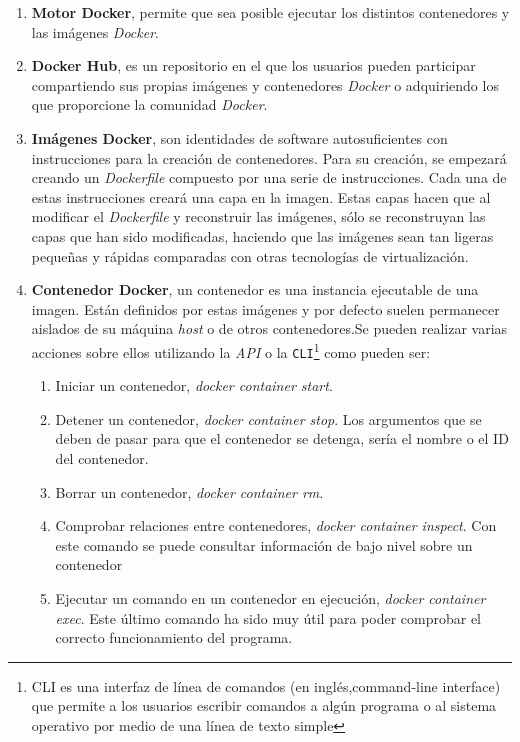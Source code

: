 \begin{enumerate}
\begin{enumerate}
    \end{enumerate}
    \item \textbf{Motor Docker}, permite que sea posible ejecutar los distintos contenedores y las imágenes \textit{Docker}. 
    \item \textbf{Docker Hub}, es un repositorio en el que los usuarios pueden participar compartiendo sus propias imágenes y contenedores \textit{Docker} o adquiriendo los que proporcione la comunidad \textit{Docker}. 
    \item \textbf{Imágenes Docker}, son identidades de software autosuficientes con instrucciones para la creación de contenedores. Para su creación, se empezará creando un \textit{Dockerfile} compuesto por una serie de instrucciones. Cada una de estas instrucciones creará una capa en la imagen. Estas capas hacen que al modificar el \textit{Dockerfile} y reconstruir las imágenes, sólo se reconstruyan las capas que han sido modificadas, haciendo que las imágenes sean tan ligeras pequeñas y rápidas comparadas con otras tecnologías de virtualización.
    \item \textbf{Contenedor Docker}, un contenedor es una instancia ejecutable de una imagen. Están definidos por estas imágenes y por defecto suelen permanecer aislados de su máquina \textit{host} o de otros contenedores.Se pueden realizar varias acciones sobre ellos utilizando la \textit{API} o la \texttt{CLI}\footnote{CLI es una interfaz de línea de comandos (en inglés,command-line interface) que permite a los usuarios escribir comandos a algún programa o al sistema operativo por medio de una línea de texto simple } como pueden ser:
    \begin{enumerate}
        \item Iniciar un contenedor, \emph{docker container start}.
        \item Detener un contenedor, \emph{docker container stop}. Los argumentos que se deben de pasar para que el contenedor se detenga, sería el nombre o el ID del contenedor. 
        \item Borrar un contenedor, \emph{docker container rm}. 
        \item Comprobar relaciones entre contenedores, \emph{docker container inspect}. Con este comando se puede consultar información de bajo nivel sobre un contenedor
        \item Ejecutar un comando en un contenedor en ejecución, \emph{docker container exec}. Este último comando ha sido muy útil para poder comprobar el correcto funcionamiento del programa.
    \end{enumerate}
\end{enumerate}

